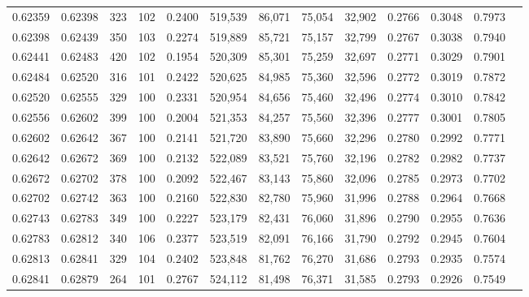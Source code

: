 \begin{tabular}{rrrrrrrrrrrrr}
0.62359 & 0.62398 &   323 & 102 &                                     0.2400 & 519,539 &  86,071 &  75,054 &  32,902 & 0.2766 & 0.3048 & 0.7973 \\
0.62398 & 0.62439 &   350 & 103 &                                     0.2274 & 519,889 &  85,721 &  75,157 &  32,799 & 0.2767 & 0.3038 & 0.7940 \\
0.62441 & 0.62483 &   420 & 102 &                                     0.1954 & 520,309 &  85,301 &  75,259 &  32,697 & 0.2771 & 0.3029 & 0.7901 \\
0.62484 & 0.62520 &   316 & 101 &                                     0.2422 & 520,625 &  84,985 &  75,360 &  32,596 & 0.2772 & 0.3019 & 0.7872 \\
0.62520 & 0.62555 &   329 & 100 &                                     0.2331 & 520,954 &  84,656 &  75,460 &  32,496 & 0.2774 & 0.3010 & 0.7842 \\
0.62556 & 0.62602 &   399 & 100 &                                     0.2004 & 521,353 &  84,257 &  75,560 &  32,396 & 0.2777 & 0.3001 & 0.7805 \\
0.62602 & 0.62642 &   367 & 100 &                                     0.2141 & 521,720 &  83,890 &  75,660 &  32,296 & 0.2780 & 0.2992 & 0.7771 \\
0.62642 & 0.62672 &   369 & 100 &                                     0.2132 & 522,089 &  83,521 &  75,760 &  32,196 & 0.2782 & 0.2982 & 0.7737 \\
0.62672 & 0.62702 &   378 & 100 &                                     0.2092 & 522,467 &  83,143 &  75,860 &  32,096 & 0.2785 & 0.2973 & 0.7702 \\
0.62702 & 0.62742 &   363 & 100 &                                     0.2160 & 522,830 &  82,780 &  75,960 &  31,996 & 0.2788 & 0.2964 & 0.7668 \\
0.62743 & 0.62783 &   349 & 100 &                                     0.2227 & 523,179 &  82,431 &  76,060 &  31,896 & 0.2790 & 0.2955 & 0.7636 \\
0.62783 & 0.62812 &   340 & 106 &                                     0.2377 & 523,519 &  82,091 &  76,166 &  31,790 & 0.2792 & 0.2945 & 0.7604 \\
0.62813 & 0.62841 &   329 & 104 &                                     0.2402 & 523,848 &  81,762 &  76,270 &  31,686 & 0.2793 & 0.2935 & 0.7574 \\
0.62841 & 0.62879 &   264 & 101 &                                     0.2767 & 524,112 &  81,498 &  76,371 &  31,585 & 0.2793 & 0.2926 & 0.7549 \\

\end{tabular}
